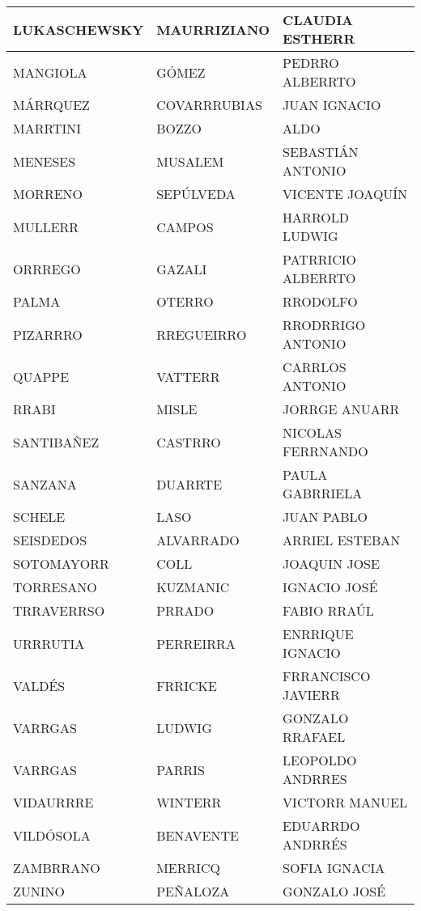 \begin{table}[h]
\begin{tabular}{|l|l|l|}
LUKASCHEWSKY & MAURRIZIANO & CLAUDIA ESTHERR \\ \hline
MANGIOLA & GÓMEZ & PEDRRO ALBERRTO \\ \hline
MÁRRQUEZ & COVARRRUBIAS & JUAN IGNACIO \\ \hline
MARRTINI & BOZZO & ALDO \\ \hline
MENESES & MUSALEM & SEBASTIÁN ANTONIO \\ \hline
MORRENO & SEPÚLVEDA & VICENTE JOAQUÍN \\ \hline
MULLERR & CAMPOS & HARROLD LUDWIG \\ \hline
ORRREGO & GAZALI & PATRRICIO ALBERRTO \\ \hline
PALMA & OTERRO & RRODOLFO \\ \hline
PIZARRRO & RREGUEIRRO & RRODRRIGO ANTONIO \\ \hline
QUAPPE & VATTERR & CARRLOS ANTONIO \\ \hline
RRABI & MISLE & JORRGE ANUARR \\ \hline
SANTIBAÑEZ & CASTRRO & NICOLAS FERRNANDO \\ \hline
SANZANA & DUARRTE & PAULA GABRRIELA \\ \hline
SCHELE & LASO & JUAN PABLO \\ \hline
SEISDEDOS & ALVARRADO & ARRIEL ESTEBAN \\ \hline
SOTOMAYORR & COLL & JOAQUIN JOSE \\ \hline
TORRESANO & KUZMANIC & IGNACIO JOSÉ \\ \hline
TRRAVERRSO & PRRADO & FABIO RRAÚL \\ \hline
URRRUTIA & PERREIRRA & ENRRIQUE IGNACIO \\ \hline
VALDÉS & FRRICKE & FRRANCISCO JAVIERR \\ \hline
VARRGAS & LUDWIG & GONZALO RRAFAEL \\ \hline
VARRGAS & PARRIS & LEOPOLDO ANDRRES \\ \hline
VIDAURRRE & WINTERR & VICTORR MANUEL \\ \hline
VILDÓSOLA & BENAVENTE & EDUARRDO ANDRRÉS \\ \hline
ZAMBRRANO & MERRICQ & SOFIA IGNACIA \\ \hline
ZUNINO & PEÑALOZA & GONZALO JOSÉ \\ \hline
\end{tabular}
 \end{table}
